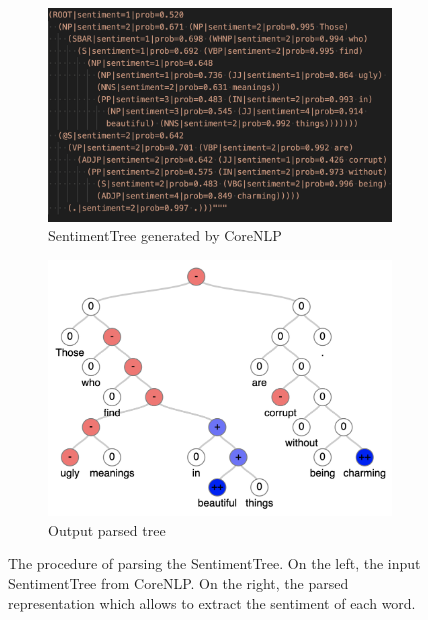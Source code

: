 \begin{figure}[!htbp]
     \centering
     \begin{subfigure}[b]{0.45\textwidth}
         \centering
         \includegraphics[width=\textwidth]{figures/sentiment_tree_2.png}
         \caption{SentimentTree generated by CoreNLP}
         \label{fig:raw_sentiment_tree}
     \end{subfigure}
     \hfill
     \begin{subfigure}[b]{0.45\textwidth}
         \centering
         \includegraphics[width=\textwidth]{figures/parse_tree.png}
         \caption{Output parsed tree}
         \label{fig:parsed_sentiment_tree}
     \end{subfigure}
        \caption{The procedure of parsing the SentimentTree. On the left, the input SentimentTree from CoreNLP. On the right, the parsed representation which allows to extract the sentiment of each word.}
        \label{fig:parsing_sentiment_tree}
\end{figure}

